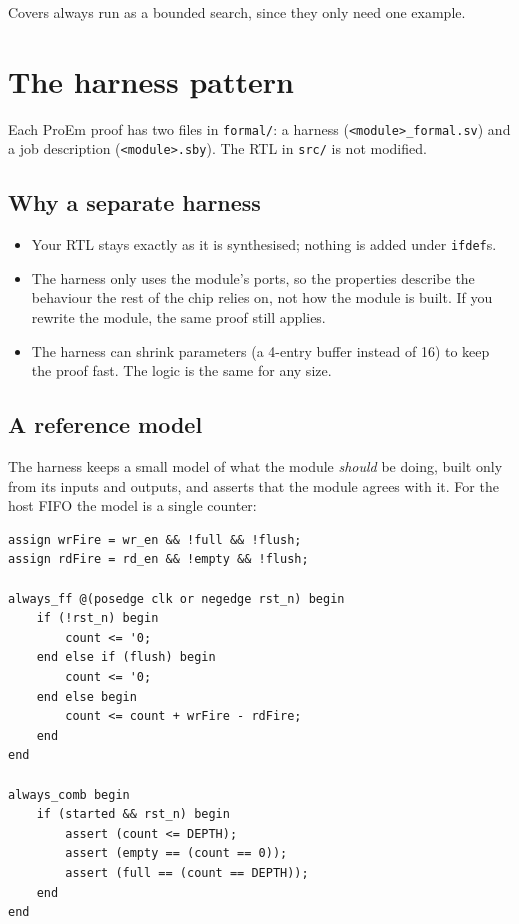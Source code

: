 \documentclass[11pt,a4paper]{article}
\newcommand{\file}[1]{\texttt{#1}}
\begin{document}
Covers always run as a bounded search, since they only need one example.

\section{The harness pattern}

Each ProEm proof has two files in \file{formal/}: a harness (\file{\textless module\textgreater\_formal.sv}) and a job description (\file{\textless module\textgreater.sby}). The RTL in \file{src/} is not modified.

\subsection{Why a separate harness}

\begin{itemize}
\item Your RTL stays exactly as it is synthesised; nothing is added under \texttt{ifdef}s.
\item The harness only uses the module's ports, so the properties describe the behaviour the rest of the chip relies on, not how the module is built. If you rewrite the module, the same proof still applies.
\item The harness can shrink parameters (a 4-entry buffer instead of 16) to keep the proof fast. The logic is the same for any size.
\end{itemize}

\subsection{A reference model}

The harness keeps a small model of what the module \emph{should} be doing, built only from its inputs and outputs, and asserts that the module agrees with it. For the host FIFO the model is a single counter:

\begin{lstlisting}
assign wrFire = wr_en && !full && !flush;
assign rdFire = rd_en && !empty && !flush;

always_ff @(posedge clk or negedge rst_n) begin
	if (!rst_n) begin
		count <= '0;
	end else if (flush) begin
		count <= '0;
	end else begin
		count <= count + wrFire - rdFire;
	end
end

always_comb begin
	if (started && rst_n) begin
		assert (count <= DEPTH);
		assert (empty == (count == 0));
		assert (full == (count == DEPTH));
	end
end
\end{lstlisting}
\end{document}

